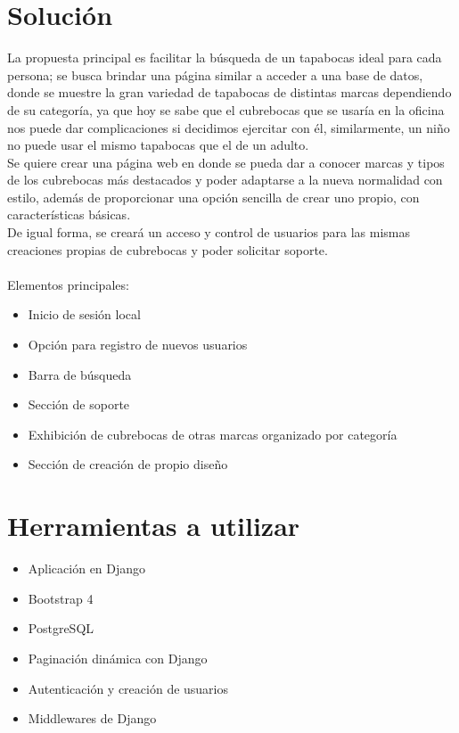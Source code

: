 \documentclass[letterpaper,12pt]{article}
\begin{document}
\section{Solución}
La propuesta principal es facilitar la búsqueda de un tapabocas ideal para cada persona; se busca brindar una página similar a acceder a una base de datos, donde se muestre la gran variedad de tapabocas de distintas marcas dependiendo de su categoría, ya que hoy se sabe que el cubrebocas que se usaría en la oficina nos puede dar complicaciones si decidimos ejercitar con él, similarmente, un niño no puede usar el mismo tapabocas que el de un adulto. \\
Se quiere crear una página web en donde se pueda dar a conocer marcas y tipos de los cubrebocas más destacados y poder adaptarse a la nueva normalidad con estilo, además de proporcionar una opción sencilla de crear uno propio, con características básicas. \\
De igual forma, se creará un acceso y control de usuarios para las mismas creaciones propias de cubrebocas y poder solicitar soporte.\\\\
Elementos principales:
\begin{itemize}
	\item Inicio de sesión local
	\item Opción para registro de nuevos usuarios
	\item Barra de búsqueda
	\item Sección de soporte
	\item Exhibición de cubrebocas de otras marcas organizado por categoría
	\item Sección de creación de propio diseño
\end{itemize}
\section{Herramientas a utilizar}
\begin{itemize}
	\item Aplicación en Django
	\item Bootstrap 4
	\item PostgreSQL
	\item Paginación dinámica con Django
	\item Autenticación y creación de usuarios
	\item Middlewares de Django
\end{itemize}
\end{document}
